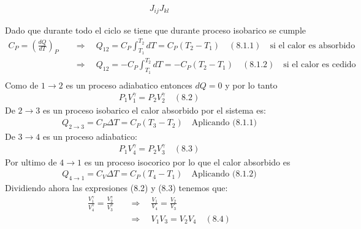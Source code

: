 \documentclass[a4paper]{article}
\begin{document}
\begin{answer}[punto 21]
        \begin{align*}
            J_{ij} J_{kl}
        \end{align*}

      
     


    \end{answer}
    
    \begin{answer}[Punto 8]
        Dado que durante todo el ciclo se tiene que durante proceso isobarico se cumple
        \begin{align*}
            C_P = \left( \frac{dQ}{dT} \right)_P  \quad &\Rightarrow \quad Q_{12} = C_P \int _{T_1}^{T_2} dT = C_P (T_2 - T_1) \quad (8.1.1) \quad \text{si el calor es absorbido}\\
            &\Rightarrow \quad Q_{12} = -C_P \int _{T_1}^{T_2} dT = -C_P (T_2 - T_1) \quad (8.1.2) \quad \text{si el calor es cedido}\\
        \end{align*}
        Como de $1 \rightarrow 2$ es un proceso adiabatico entonces $dQ = 0$ y por lo tanto
        \begin{align*}
            P_1V_1^\gamma = P_2V_2^\gamma \quad (8.2)
        \end{align*}
        De $2 \rightarrow 3$ es un proceso isobarico el calor absorbido por el sistema es:
        \begin{align*}
            Q_{2\rightarrow 3} = C_P \Delta T = C_P (T_3 - T_2) \quad \text{Aplicando (8.1.1)}
        \end{align*}
        De $3 \rightarrow 4$ es un proceso adiabatico:
        \begin{align*}
            P_1V_4^\gamma = P_2V_3^\gamma \quad (8.3)
        \end{align*}
        Por ultimo de $4 \rightarrow 1$ es un proceso isocorico por lo que el calor absorbido es
        \begin{align*}
            Q_{4\rightarrow 1} = C_V \Delta T = C_P (T_4 - T_1) \quad \text{Aplicando (8.1.2)}
        \end{align*}
        Dividiendo ahora las expresiones (8.2) y (8.3) tenemos que:
        \begin{align*}
            \frac{V_1^\gamma}{V_4^\gamma} = \frac{V_2^\gamma}{V_3^\gamma} \quad &\Rightarrow \quad \frac{V_1}{V_4} = \frac{V_2}{V_3}\\
            & \Rightarrow \quad V_1 V_3 = V_2 V_4 \quad (8.4)
        \end{align*}


\end{answer}
\end{document}
